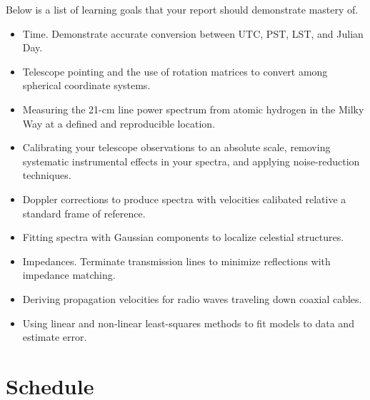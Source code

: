\documentclass[11pt,preprint]{aastex}
\begin{document}
Below is a list of learning goals that your report should demonstrate mastery of.

\begin{itemize}

\item Time. Demonstrate accurate conversion between UTC, PST, LST,
and Julian Day.

\item Telescope pointing and the use of rotation matrices to convert among spherical
  coordinate systems.

\item Measuring the 21-cm line power spectrum from atomic hydrogen in the
  Milky Way at a defined and reproducible location.

\item Calibrating your telescope observations to an absolute scale, removing
systematic instrumental effects in your spectra, and applying noise-reduction
techniques.

\item Doppler corrections to produce spectra with velocities 
calibated relative a standard frame of reference.

\item Fitting spectra with Gaussian components to localize celestial structures.

\item Impedances. Terminate transmission lines to 
minimize reflections with impedance matching.

\item Deriving propagation velocities for radio waves traveling down coaxial cables.

\item Using linear and non-linear least-squares methods to fit models to data and
estimate error.

\end{itemize}

\section{Schedule}
\end{document}
